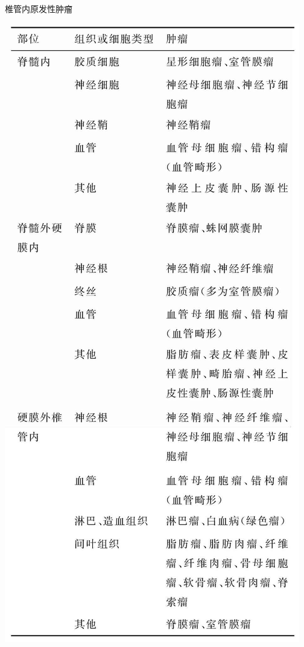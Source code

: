 \begin{table}[htbp]
\centering
\caption{椎管内原发性肿瘤}
\label{tab23-1}
\includegraphics[width=\textwidth,height=\textheight,keepaspectratio]{./images/Image00478.jpg}
\end{table}


